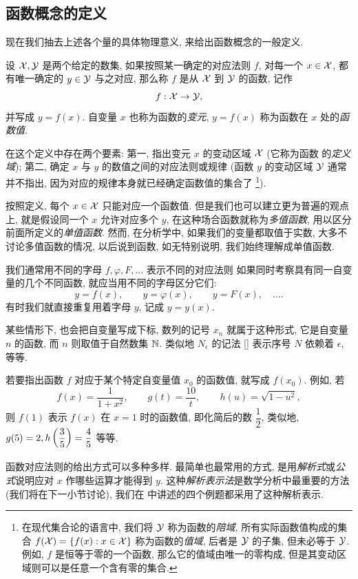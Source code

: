 \subsection{函数概念的定义}\label{subsec:45}
现在我们抽去上述各个量的具体物理意义, 来给出函数概念的一般定义.

{\kaishu 设 $\mathcal{X},\mathcal{Y}$ 是两个给定的数集,
如果按照某一确定的对应法则 $f$,
对每一个 $x\in\mathcal{X}$, 都有唯一确定的 $y\in\mathcal{Y}$ 与之对应,
那么称 $f$ 是从 $\mathcal{X}$ 到 $\mathcal{Y}$ 的函数, 记作
$$
f:\mathcal{X}\to\mathcal{Y},
$$
并写成 $y=f(x)$}.
自变量 $x$ 也称为函数的\emph{变元},
$y=f(x)$ 称为函数在 $x$ 处的\emph{函数值}.

在这个定义中存在两个要素:
第一, 指出变元 $x$ 的变动区域 $\mathcal{X}$ (它称为函数 的\emph{定义域});
第二, 确定 $x$ 与 $y$ 的数值之间的对应法则或规律
(函数 $y$ 的变动区域 $\mathcal{Y}$ 通常并不指出, 因为对应的规律本身就已经确定函数值的集合了
\footnote{在现代集合论的语言中,
我们将 $\mathcal{Y}$ 称为函数的\emph{陪域},
所有实际函数值构成的集合 $f(\mathcal{X})=\{f(x):x\in\mathcal{X}\}$ 称为函数的\emph{值域},
后者是 $\mathcal{Y}$ 的子集, 但未必等于 $\mathcal{Y}$.
例如, $f$ 是恒等于零的一个函数, 那么它的值域由唯一的零构成, 但是其变动区域则可以是任意一个含有零的集合.
}).

按照定义, 每个 $x\in\mathcal{X}$ 只能对应一个函数值.
但是我们也可以建立更为普遍的观点上, 就是假设同一个 $x$ 允许对应多个 $y$,
在这种场合函数就称为\emph{多值函数},
用以区分前面所定义的\emph{单值函数}.
然而, 在分析学中, 如果我们的变量都取值于实数, 大多不讨论多值函数的情况,
以后说到函数, 如无特别说明, 我们始终理解成单值函数.

我们通常用不同的字母 $f,\varphi,F,\ldots$ 表示不同的对应法则
如果同时考察具有同一自变量的几个不同函数,
就应当用不同的字母区分它们:
$$
y=f(x),\qquad y=\varphi(x),\qquad y=F(x),\quad\ldots.
$$
有时我们就直接重复用着字母 $y$, 记成 $y=y(x)$.

某些情形下, 也会把自变量写成下标,
数列的记号 $x_n$ 就属于这种形式, 它是自变量 $n$ 的函数, 而 $n$ 则取值于自然数集 $\mathbb{N}$.
类似地 $N_\epsilon$ 的记法 [] 表示序号 $N$ 依赖着 $\epsilon$, 等等.

若要指出函数 $f$ 对应于某个特定自变量值 $x_0$ 的函数值,
就写成 $f(x_0)$.
例如, 若
$$
f(x)=\frac{1}{1+x^2},\qquad
g(t)=\frac{10}{t},\qquad
h(u)=\sqrt{1-u^2},
$$
则 $f(1)$ 表示 $f(x)$ 在 $x=1$ 时的函数值, 即化简后的数 $\dfrac{1}{2}$,
类似地, $g(5)=2, h\left( \dfrac35 \right)=\dfrac45$ 等等.

函数对应法则的给出方式可以多种多样.
最简单也最常用的方式,
是用\emph{解析式}或\emph{公式}说明应对 $x$ 作哪些运算才能得到 $y$.
这种\emph{解析表示法}是数学分析中最重要的方法 (我们将在下一小节讨论),
我们在  中讲述的四个例题都采用了这种解析表示.

